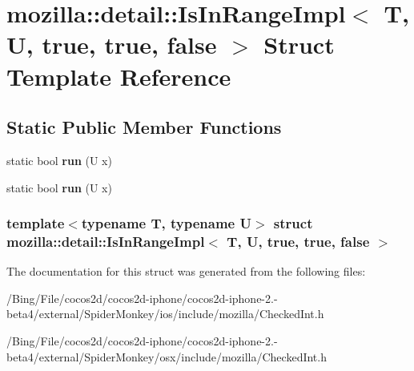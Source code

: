 \hypertarget{structmozilla_1_1detail_1_1_is_in_range_impl_3_01_t_00_01_u_00_01true_00_01true_00_01false_01_4}{\section{mozilla\-:\-:detail\-:\-:Is\-In\-Range\-Impl$<$ T, U, true, true, false $>$ Struct Template Reference}
\label{structmozilla_1_1detail_1_1_is_in_range_impl_3_01_t_00_01_u_00_01true_00_01true_00_01false_01_4}
}
\subsection*{Static Public Member Functions}
\begin{DoxyCompactItemize}
\item 
\hypertarget{structmozilla_1_1detail_1_1_is_in_range_impl_3_01_t_00_01_u_00_01true_00_01true_00_01false_01_4_af0e2dec9c7bf4200842a58927338618e}{static bool {\bfseries run} (U x)}\label{structmozilla_1_1detail_1_1_is_in_range_impl_3_01_t_00_01_u_00_01true_00_01true_00_01false_01_4_af0e2dec9c7bf4200842a58927338618e}

\item 
\hypertarget{structmozilla_1_1detail_1_1_is_in_range_impl_3_01_t_00_01_u_00_01true_00_01true_00_01false_01_4_af0e2dec9c7bf4200842a58927338618e}{static bool {\bfseries run} (U x)}\label{structmozilla_1_1detail_1_1_is_in_range_impl_3_01_t_00_01_u_00_01true_00_01true_00_01false_01_4_af0e2dec9c7bf4200842a58927338618e}

\end{DoxyCompactItemize}
\subsubsection*{template$<$typename T, typename U$>$ struct mozilla\-::detail\-::\-Is\-In\-Range\-Impl$<$ T, U, true, true, false $>$}



The documentation for this struct was generated from the following files\-:\begin{DoxyCompactItemize}
\item 
/\-Bing/\-File/cocos2d/cocos2d-\/iphone/cocos2d-\/iphone-\/2.-\/beta4/external/\-Spider\-Monkey/ios/include/mozilla/Checked\-Int.\-h\item 
/\-Bing/\-File/cocos2d/cocos2d-\/iphone/cocos2d-\/iphone-\/2.-\/beta4/external/\-Spider\-Monkey/osx/include/mozilla/Checked\-Int.\-h\end{DoxyCompactItemize}
